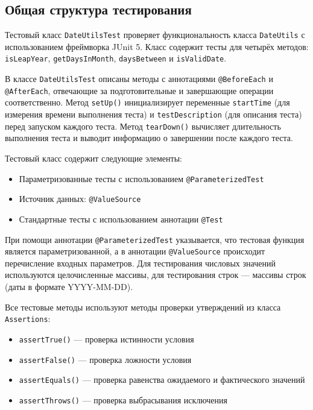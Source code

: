 \documentclass{article}[14pt]
\begin{document}
\subsection{Общая структура тестирования}

Тестовый класс \texttt{DateUtilsTest} проверяет функциональность класса \texttt{DateUtils} с использованием фреймворка JUnit 5. Класс содержит тесты для четырёх методов: \texttt{isLeapYear}, \texttt{getDaysInMonth}, \texttt{daysBetween} и \texttt{isValidDate}.

В классе \texttt{DateUtilsTest} описаны методы с аннотациями \texttt{@BeforeEach} и \texttt{@AfterEach}, отвечающие за подготовительные и завершающие операции соответственно. Метод \texttt{setUp()} инициализирует переменные \texttt{startTime} (для измерения времени выполнения теста) и \texttt{testDescription} (для описания теста) перед запуском каждого теста. Метод \texttt{tearDown()} вычисляет длительность выполнения теста и выводит информацию о завершении после каждого теста.

Тестовый класс содержит следующие элементы:
\begin{itemize}
    \item Параметризованные тесты с использованием \texttt{@ParameterizedTest}
    \item Источник данных: \texttt{@ValueSource}
    \item Стандартные тесты с использованием аннотации \texttt{@Test}
\end{itemize}

При помощи аннотации \texttt{@ParameterizedTest} указывается, что тестовая функция является параметризованной, а в аннотации \texttt{@ValueSource} происходит перечисление входных параметров. Для тестирования числовых значений используются целочисленные массивы, для тестирования строк — массивы строк (даты в формате YYYY-MM-DD).

Все тестовые методы используют методы проверки утверждений из класса \texttt{Assertions}:
\begin{itemize}
    \item \texttt{assertTrue()} — проверка истинности условия
    \item \texttt{assertFalse()} — проверка ложности условия
    \item \texttt{assertEquals()} — проверка равенства ожидаемого и фактического значений
    \item \texttt{assertThrows()} — проверка выбрасывания исключения
\end{itemize}
\end{document}
